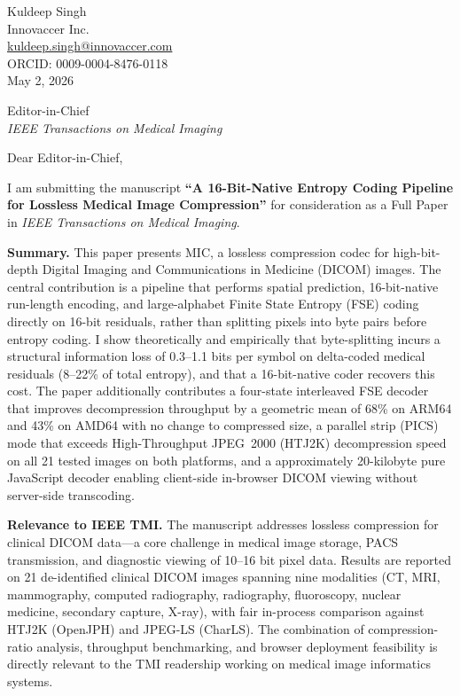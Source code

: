 \documentclass[12pt]{article}
\begin{document}
\begin{flushright}
Kuldeep Singh\\
Innovaccer Inc.\\
\href{mailto:kuldeep.singh@innovaccer.com}{kuldeep.singh@innovaccer.com}\\
ORCID: 0009-0004-8476-0118\\[6pt]
May 2, 2026
\end{flushright}

\bigskip

Editor-in-Chief\\
\textit{IEEE Transactions on Medical Imaging}

\bigskip

\noindent Dear Editor-in-Chief,

\medskip

I am submitting the manuscript \textbf{``A 16-Bit-Native Entropy Coding
Pipeline for Lossless Medical Image Compression''} for consideration as a Full
Paper in \textit{IEEE Transactions on Medical Imaging}.

\medskip
\noindent\textbf{Summary.}
This paper presents MIC, a lossless compression codec for high-bit-depth
Digital Imaging and Communications in Medicine (DICOM) images. The central
contribution is a pipeline that performs spatial prediction, 16-bit-native
run-length encoding, and large-alphabet Finite State Entropy (FSE) coding
directly on 16-bit residuals, rather than splitting pixels into byte pairs
before entropy coding. I show theoretically and empirically that byte-splitting
incurs a structural information loss of 0.3--1.1 bits per symbol on
delta-coded medical residuals (8--22\% of total entropy), and that a
16-bit-native coder recovers this cost. The paper additionally contributes a
four-state interleaved FSE decoder that improves decompression throughput by a
geometric mean of 68\% on ARM64 and 43\% on AMD64 with no change to
compressed size, a parallel strip (PICS) mode that exceeds High-Throughput
JPEG~2000 (HTJ2K) decompression speed on all 21 tested images on both
platforms, and a approximately 20-kilobyte pure JavaScript decoder enabling
client-side in-browser DICOM viewing without server-side transcoding.

\medskip
\noindent\textbf{Relevance to IEEE TMI.}
The manuscript addresses lossless compression for clinical DICOM data---a
core challenge in medical image storage, PACS transmission, and diagnostic
viewing of 10--16 bit pixel data. Results are reported on 21 de-identified
clinical DICOM images spanning nine modalities (CT, MRI, mammography,
computed radiography, radiography, fluoroscopy, nuclear medicine, secondary
capture, X-ray), with fair in-process comparison against HTJ2K (OpenJPH)
and JPEG-LS (CharLS). The combination of compression-ratio analysis,
throughput benchmarking, and browser deployment feasibility is directly
relevant to the TMI readership working on medical image informatics systems.
\end{document}
